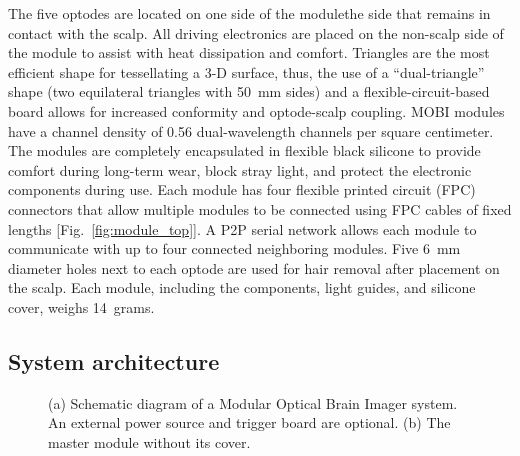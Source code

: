 The five optodes are located on one side of the module\textemdash the side that remains in contact with the scalp. All driving electronics are placed on the non-scalp side of the module to assist with heat dissipation and comfort. Triangles are the most efficient shape for tessellating a 3-D surface, thus, the use of a ``dual-triangle'' shape (two equilateral triangles with 50~mm sides) and a flexible-circuit-based board allows for increased conformity and optode-scalp coupling. \ac{MOBI} modules have a channel density of 0.56 dual-wavelength channels per square centimeter. The modules are completely encapsulated in flexible black silicone to provide comfort during long-term wear, block stray light, and protect the electronic components during use. Each module has four flexible printed circuit (FPC) connectors that allow multiple modules to be connected using FPC cables of fixed lengths [Fig.~\ref{fig:module_top}]. A \ac{P2P} serial network allows each module to communicate with up to four connected neighboring modules. Five 6~mm diameter holes next to each optode are used for hair removal after placement on the scalp. Each module, including the components, light guides, and silicone cover, weighs 14~grams. 

\subsection{System architecture}
\begin{figure}
	\begin{center}
	\end{center}
	\caption{(a) Schematic diagram of a Modular Optical Brain Imager system. An external power source and trigger board are optional. (b) The master module without its cover.} 
	\label{fig:architecture}
\end{figure} 

